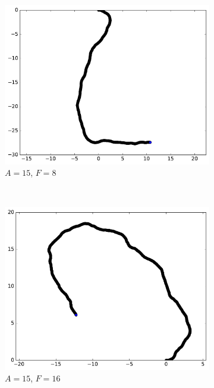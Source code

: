\begin{figure}[htb]
\begin{subfigure}[t]{\subImgWmo}
			\centering
			\includegraphics[width=\textwidth]{figures/ch3/synTraj_219_15_8}
			\caption[$A = 15$, $F=8$]{$A = 15$, $F=8$}
			\label{fig:synTraj_219_15_8}
		\end{subfigure}
		~
		\begin{subfigure}[t]{\subImgWmo}
			\centering
			\includegraphics[width=\textwidth]{figures/ch3/synTraj_219_15_16}
			\caption[$A = 15$, $F=16$]{$A = 15$, $F=16$}
			\label{fig:synTraj_219_15_16}
		\end{subfigure}
		~
		\begin{subfigure}[t]{\subImgWmo}
			\centering

\end{subfigure}
\end{figure}
